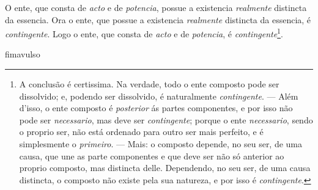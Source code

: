  O ente, que consta de
\emph{acto} e de \emph{potencia}, possue a existencia \emph{realmente} distincta da
essencia. Ora o ente, que possue a existencia \emph{realmente} distincta da essencia, é
\emph{contingente}. Logo o ente, que consta de \emph{acto} e de \emph{potencia}, é
\emph{contingente}\footnote{A conclusão é certissima. Na verdade, todo o ente composto
pode ser dissolvido; e, podendo ser dissolvido, é naturalmente \emph{contingente}. ---
Além d'isso, o ente composto é \emph{posterior} ás partes componentes, e por isso não pode
ser \emph{necessario}, mas deve ser \emph{contingente}; porque o ente \emph{necessario},
sendo o proprio ser, não está ordenado para outro ser mais perfeito, e é simplesmente o
\emph{primeiro}. --- Mais: o composto depende, no seu ser, de uma causa, que une as parte
componentes e que deve ser não só anterior ao proprio composto, mas distincta delle.
Dependendo, no seu ser, de uma causa distincta, o composto não existe pela sua natureza,
e por isso é \emph{contingente}.}.

\csname fimavulso\endcsname
